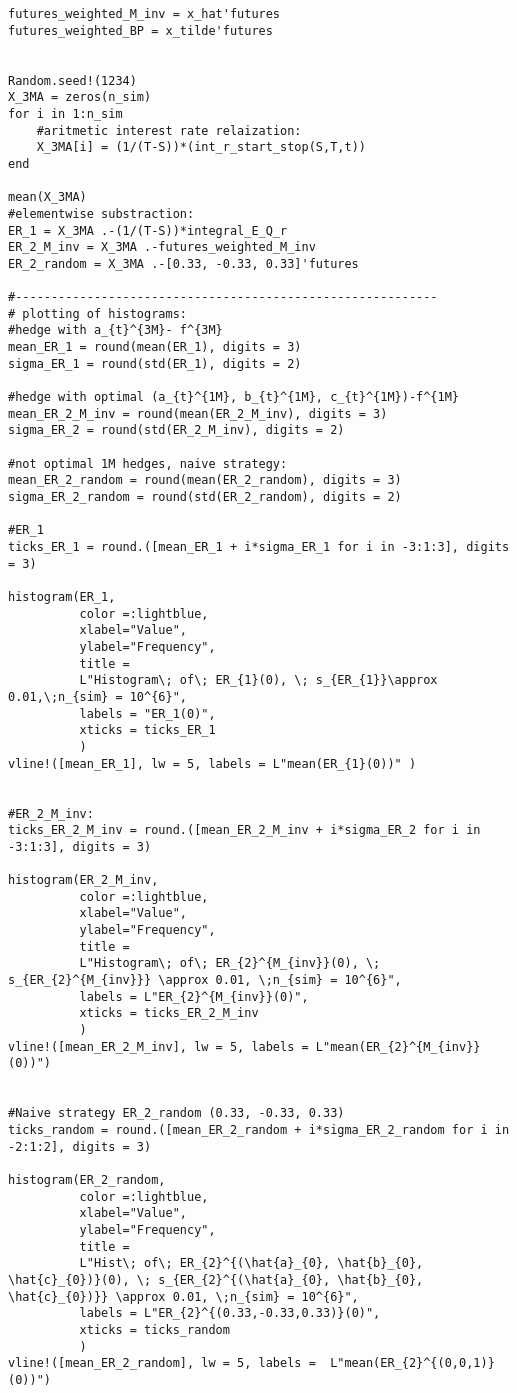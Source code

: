 \begin{verbatim}
futures_weighted_M_inv = x_hat'futures
futures_weighted_BP = x_tilde'futures


Random.seed!(1234)
X_3MA = zeros(n_sim)
for i in 1:n_sim
    #aritmetic interest rate relaization:
    X_3MA[i] = (1/(T-S))*(int_r_start_stop(S,T,t))
end

mean(X_3MA)
#elementwise substraction:
ER_1 = X_3MA .-(1/(T-S))*integral_E_Q_r
ER_2_M_inv = X_3MA .-futures_weighted_M_inv
ER_2_random = X_3MA .-[0.33, -0.33, 0.33]'futures

#-----------------------------------------------------------
# plotting of histograms: 
#hedge with a_{t}^{3M}- f^{3M}
mean_ER_1 = round(mean(ER_1), digits = 3)
sigma_ER_1 = round(std(ER_1), digits = 2) 

#hedge with optimal (a_{t}^{1M}, b_{t}^{1M}, c_{t}^{1M})-f^{1M}
mean_ER_2_M_inv = round(mean(ER_2_M_inv), digits = 3)
sigma_ER_2 = round(std(ER_2_M_inv), digits = 2)

#not optimal 1M hedges, naive strategy:  
mean_ER_2_random = round(mean(ER_2_random), digits = 3)
sigma_ER_2_random = round(std(ER_2_random), digits = 2)

#ER_1
ticks_ER_1 = round.([mean_ER_1 + i*sigma_ER_1 for i in -3:1:3], digits = 3)

histogram(ER_1, 
          color =:lightblue, 
          xlabel="Value", 
          ylabel="Frequency", 
          title = 
          L"Histogram\; of\; ER_{1}(0), \; s_{ER_{1}}\approx 0.01,\;n_{sim} = 10^{6}", 
          labels = "ER_1(0)", 
          xticks = ticks_ER_1
          )
vline!([mean_ER_1], lw = 5, labels = L"mean(ER_{1}(0))" )


#ER_2_M_inv:
ticks_ER_2_M_inv = round.([mean_ER_2_M_inv + i*sigma_ER_2 for i in -3:1:3], digits = 3)

histogram(ER_2_M_inv, 
          color =:lightblue, 
          xlabel="Value", 
          ylabel="Frequency", 
          title = 
          L"Histogram\; of\; ER_{2}^{M_{inv}}(0), \; s_{ER_{2}^{M_{inv}}} \approx 0.01, \;n_{sim} = 10^{6}", 
          labels = L"ER_{2}^{M_{inv}}(0)", 
          xticks = ticks_ER_2_M_inv
          )
vline!([mean_ER_2_M_inv], lw = 5, labels = L"mean(ER_{2}^{M_{inv}}(0))")


#Naive strategy ER_2_random (0.33, -0.33, 0.33)
ticks_random = round.([mean_ER_2_random + i*sigma_ER_2_random for i in -2:1:2], digits = 3)

histogram(ER_2_random, 
          color =:lightblue, 
          xlabel="Value", 
          ylabel="Frequency", 
          title = 
          L"Hist\; of\; ER_{2}^{(\hat{a}_{0}, \hat{b}_{0}, \hat{c}_{0})}(0), \; s_{ER_{2}^{(\hat{a}_{0}, \hat{b}_{0}, \hat{c}_{0})}} \approx 0.01, \;n_{sim} = 10^{6}", 
          labels = L"ER_{2}^{(0.33,-0.33,0.33)}(0)", 
          xticks = ticks_random
          )
vline!([mean_ER_2_random], lw = 5, labels =  L"mean(ER_{2}^{(0,0,1)}(0))")




\end{verbatim}
